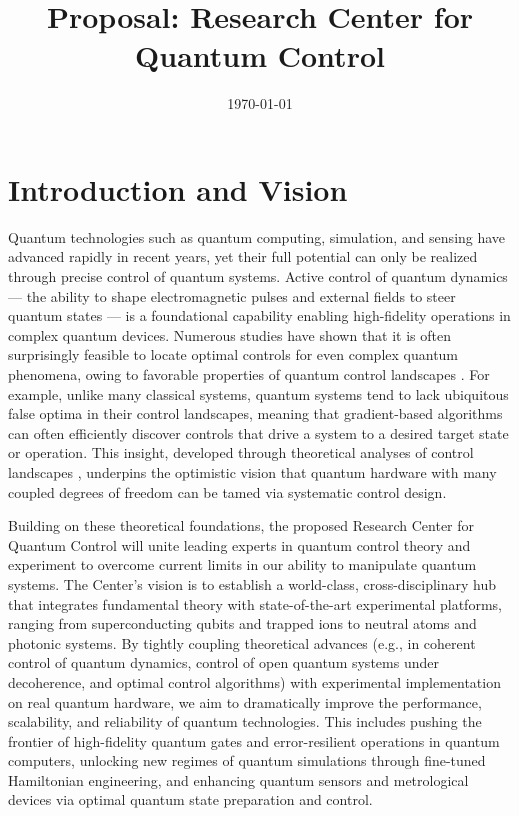 \documentclass[11pt]{article}
\title{\bf Proposal: Research Center for Quantum Control}
\author{}
\date{\today}
\begin{document}
\maketitle

\section{Introduction and Vision}
Quantum technologies such as quantum computing, simulation, and sensing have advanced rapidly in recent years, yet their full potential can only be realized through precise control of quantum systems. Active control of quantum dynamics --- the ability to shape electromagnetic pulses and external fields to steer quantum states --- is a foundational capability enabling high-fidelity operations in complex quantum devices. Numerous studies have shown that it is often surprisingly feasible to locate optimal controls for even complex quantum phenomena, owing to favorable properties of quantum control landscapes \cite{Rabitz07}. For example, unlike many classical systems, quantum systems tend to lack ubiquitous false optima in their control landscapes, meaning that gradient-based algorithms can often efficiently discover controls that drive a system to a desired target state or operation. This insight, developed through theoretical analyses of control landscapes \cite{Rabitz07}, underpins the optimistic vision that quantum hardware with many coupled degrees of freedom can be tamed via systematic control design.

Building on these theoretical foundations, the proposed Research Center for Quantum Control will unite leading experts in quantum control theory and experiment to overcome current limits in our ability to manipulate quantum systems. The Center's vision is to establish a world-class, cross-disciplinary hub that integrates fundamental theory with state-of-the-art experimental platforms, ranging from superconducting qubits and trapped ions to neutral atoms and photonic systems. By tightly coupling theoretical advances (e.g., in coherent control of quantum dynamics, control of open quantum systems under decoherence, and optimal control algorithms) with experimental implementation on real quantum hardware, we aim to dramatically improve the performance, scalability, and reliability of quantum technologies. This includes pushing the frontier of high-fidelity quantum gates and error-resilient operations in quantum computers, unlocking new regimes of quantum simulations through fine-tuned Hamiltonian engineering, and enhancing quantum sensors and metrological devices via optimal quantum state preparation and control.
\end{document}
